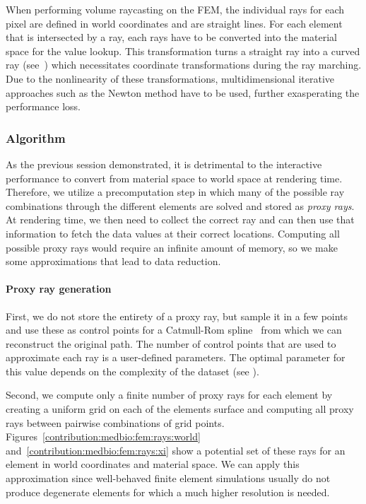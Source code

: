 When performing volume raycasting on the FEM, the individual rays for each pixel are defined in world coordinates and are straight lines. For each element that is intersected by a ray, each rays have to be converted into the material space for the value lookup. This transformation turns a straight ray into a curved ray (see~) which necessitates coordinate transformations during the ray marching. Due to the nonlinearity of these transformations, multidimensional iterative approaches such as the Newton method have to be used, further exasperating the performance loss.

\subsubsection{Algorithm}
\label{contributions:medbio:fem:algorithm}
As the previous session demonstrated, it is detrimental to the interactive performance to convert from material space to world space at rendering time. Therefore, we utilize a precomputation step in which many of the possible ray combinations through the different elements are solved and stored as \emph{proxy rays}. At rendering time, we then need to collect the correct ray and can then use that information to fetch the data values at their correct locations. Computing all possible proxy rays would require an infinite amount of memory, so we make some approximations that lead to data reduction.

\paragraph{Proxy ray generation} First, we do not store the entirety of a proxy ray, but sample it in a few points and use these as control points for a Catmull-Rom spline~\cite{catmull1974class} from which we can reconstruct the original path. The number of control points that are used to approximate each ray is a user-defined parameters. The optimal parameter for this value depends on the complexity of the dataset (see ). 

Second, we compute only a finite number of proxy rays for each element by creating a uniform grid on each of the elements surface and computing all proxy rays between pairwise combinations of grid points. Figures~\ref{contribution:medbio:fem:rays:world} and~\ref{contribution:medbio:fem:rays:xi} show a potential set of these rays for an element in world coordinates and material space. We can apply this approximation since well-behaved finite element simulations usually do not produce degenerate elements for which a much higher resolution is needed.

